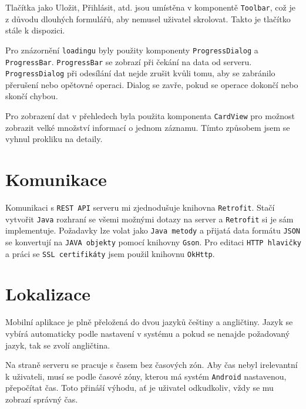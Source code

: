 \documentclass[12pt]{report}
\begin{document}
Tlačítka jako Uložit, Přihlásit, atd. jsou umístěna v komponentě \texttt{Toolbar}, což je z důvodu dlouhých formulářů, aby nemusel uživatel skrolovat. Takto je tlačítko stále k dispozici.
	
Pro znázornění \texttt{loadingu} byly použity komponenty \texttt{ProgressDialog} a \texttt{ProgressBar}.
\texttt{ProgressBar} se zobrazí při čekání na data od serveru.
\texttt{ProgressDialog} při odesílání dat nejde zrušit kvůli tomu, aby se zabránilo přerušení nebo opětovné operaci. Dialog se zavře, pokud se operace dokončí nebo skončí chybou.

Pro zobrazení dat v přehledech byla použita komponenta \texttt{CardView} pro možnost zobrazit velké množství informací o jednom záznamu. Tímto způsobem jsem se vyhnul prokliku na detaily.

\section{Komunikace}
	Komunikaci s \texttt{REST API} serveru mi zjednodušuje knihovna \texttt{Retrofit}.
	Stačí vytvořit \texttt{Java} rozhraní se všemi možnými dotazy na server a \texttt{Retrofit} si je sám implementuje.
	Požadavky lze volat jako \texttt{Java metody} a přijatá data formátu \texttt{JSON} se konvertují na \texttt{JAVA objekty} pomocí knihovny \texttt{Gson}. 
	Pro editaci \texttt{HTTP hlavičky} a práci se \texttt{SSL certifikáty} jsem použil knihovnu \texttt{OkHttp}.


\section{Lokalizace}
Mobilní aplikace je plně přeložená do dvou jazyků češtiny a angličtiny.
Jazyk se vybírá automaticky podle nastavení v systému a pokud se nenajde požadovaný jazyk, tak se zvolí angličtina. 

Na straně serveru se pracuje s časem bez časových zón.
Aby čas nebyl irelevantní k uživateli, musí se podle časové zóny, kterou má systém \texttt{Android} nastavenou, přepočítat čas.
Toto přináší výhodu, ať je uživatel odkudkoliv, vždy se mu zobrazí správný čas.

\newpage
\end{document}
